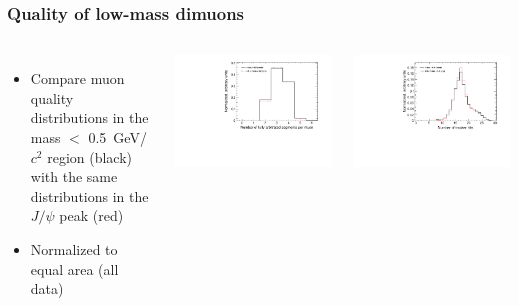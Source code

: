 \documentclass[compress]{beamer}
\begin{document}
\begin{frame}
\frametitle{Quality of low-mass dimuons}

\begin{columns}
\begin{itemize}
\item Compare muon quality distributions in the mass $<$ 0.5~GeV/$c^2$
  region (black) with the same distributions in the $J/\psi$ peak
  (red)
\item Normalized to equal area (all data)
\end{itemize}

\includegraphics[width=\linewidth]{lowmassquality_matches.pdf}

\includegraphics[width=\linewidth]{lowmassquality_hits.pdf}


\end{columns}
\end{frame}
\end{document}
